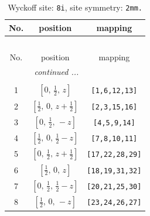 \documentclass[fleqn,8pt]{jsarticle}
\begin{document}
\renewcommand{\arraystretch}{1.2}
\begin{longtable}{ccc}
\caption{Wyckoff site: {\tt 8i}, site symmetry: {\tt 2mm.}}
 \\
 \hline \hline
No. & position & mapping \\ \hline \endfirsthead

\multicolumn{2}{l}{\tablename\ \thetable{}} \\
 \hline \hline
No. & position & mapping \\ \hline \endhead

 \hline \hline
\multicolumn{2}{r}{\footnotesize\it continued ...} \\ \endfoot

 \hline \hline
\multicolumn{2}{r}{} \\ \endlastfoot

1 & $\left[ 0,\, \frac{1}{2},\, z \right]$ & {\tt [1,6,12,13]} \\ \hline
2 & $\left[ \frac{1}{2},\, 0,\, z + \frac{1}{2} \right]$ & {\tt [2,3,15,16]} \\ \hline
3 & $\left[ 0,\, \frac{1}{2},\, - z \right]$ & {\tt [4,5,9,14]} \\ \hline
4 & $\left[ \frac{1}{2},\, 0,\, \frac{1}{2} - z \right]$ & {\tt [7,8,10,11]} \\ \hline
5 & $\left[ 0,\, \frac{1}{2},\, z + \frac{1}{2} \right]$ & {\tt [17,22,28,29]} \\ \hline
6 & $\left[ \frac{1}{2},\, 0,\, z \right]$ & {\tt [18,19,31,32]} \\ \hline
7 & $\left[ 0,\, \frac{1}{2},\, \frac{1}{2} - z \right]$ & {\tt [20,21,25,30]} \\ \hline
8 & $\left[ \frac{1}{2},\, 0,\, - z \right]$ & {\tt [23,24,26,27]} \\
\end{longtable}
\renewcommand{\arraystretch}{1.2}
\end{document}
